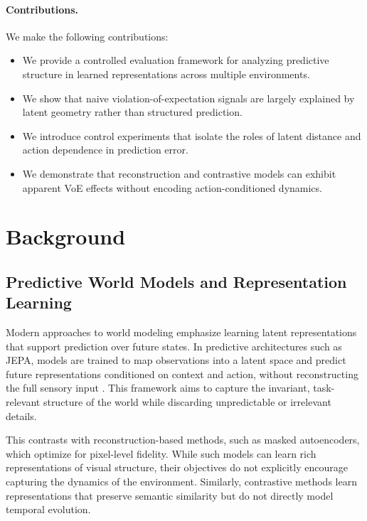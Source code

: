 \documentclass[10pt,twocolumn]{article}
\begin{document}
\paragraph{Contributions.}
We make the following contributions:
\begin{itemize}
    \item We provide a controlled evaluation framework for analyzing predictive structure in learned representations across multiple environments.
    \item We show that naive violation-of-expectation signals are largely explained by latent geometry rather than structured prediction.
    \item We introduce control experiments that isolate the roles of latent distance and action dependence in prediction error.
    \item We demonstrate that reconstruction and contrastive models can exhibit apparent VoE effects without encoding action-conditioned dynamics.
\end{itemize}

\section{Background}

\subsection{Predictive World Models and Representation Learning}

Modern approaches to world modeling emphasize learning latent representations that support prediction over future states. In predictive architectures such as JEPA, models are trained to map observations into a latent space and predict future representations conditioned on context and action, without reconstructing the full sensory input \citep{lecun2023jepa}. This framework aims to capture the invariant, task-relevant structure of the world while discarding unpredictable or irrelevant details.

This contrasts with reconstruction-based methods, such as masked autoencoders, which optimize for pixel-level fidelity. While such models can learn rich representations of visual structure, their objectives do not explicitly encourage capturing the dynamics of the environment. Similarly, contrastive methods learn representations that preserve semantic similarity but do not directly model temporal evolution.
\end{document}
